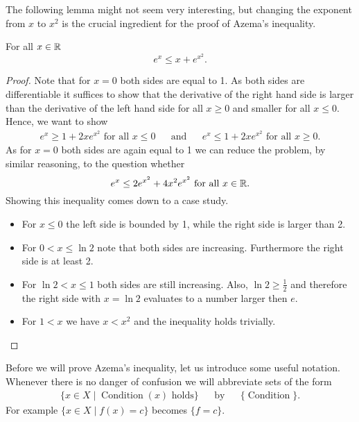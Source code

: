 The following lemma might not seem very interesting, but changing the exponent from $x$ to $x^2$ is the crucial ingredient for the proof of Azema's inequality.
\begin{lemma}\label{lem:exToex2} For all $x\in\mathbb{R}$
\[e^{x}\leq x+e^{x^2}.\]
\end{lemma} 
\begin{proof}
Note that for $x=0$ both sides are equal to 1. As both sides are differentiable it suffices to show that the derivative of the right hand side is larger than the derivative of the left hand side for all $x\geq0$ and smaller for all $x\leq0$. Hence, we want to show
\begin{align*}
e^x\geq 1+2xe^{x^2}\text{ for all $x\leq 0$} &&\text{and}&& e^x\leq 1+2xe^{x^2}\text{ for all $x\geq 0$}.
\end{align*}
As for $x=0$ both sides are again equal to 1 we can reduce the problem, by similar reasoning, to the question whether
\[e^x\leq 2e^{x^2}+4x^2e^{x^2}\text{ for all $x\in\mathbb{R}$}.\]
Showing this inequality comes down to a case study.
\begin{itemize}
\item For $x\leq0$ the left side is bounded by 1, while the right side is larger than 2.
\item For $0<x\leq\ln 2$ note that both sides are increasing. Furthermore the right side is at least 2.
\item For $\ln2<x\leq1$ both sides are still increasing. Also, $\ln2\geq\frac{1}{2}$ and therefore the right side with $x=\ln2$ evaluates to a number larger then $e$.  
\item For $1< x$ we have $x< x^2$ and the inequality holds trivially.
\end{itemize}
\end{proof}

Before we will prove Azema's inequality, let us introduce some useful notation. Whenever there is no danger of confusion we will abbreviate sets of the form
\begin{align*}
\{x\in X\mid \operatorname{Condition}(x)\text{ holds}\}&&\text{by}&&\{\operatorname{Condition}\}.
\end{align*}
For example $\{x\in X\mid f(x)= c\}$ becomes $\{f= c\}$.

